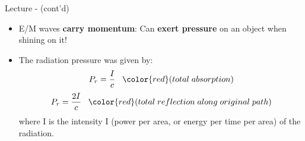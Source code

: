 %
%
%

\begin{frame}{Lecture \summarizedlecture - \lecturesummarytitle (cont'd)}

\begin{itemize}

\item
E/M waves {\bf carry momentum}:
Can {\bf exert pressure} on an object when shining on it!\\

\item
The radiation pressure was given by:
\begin{equation*}
  P_r = \frac{I}{c}
  \;\;\; {\color{red} (total \; absorption)}
\end{equation*}
\begin{equation*}
  P_r = \frac{2I}{c}
  \;\;\; {\color{red} (total \; reflection \; along \; original \; path)}
\end{equation*}
where I is the intensity I (power per area, or energy per time
per area) of the radiation.

\end{itemize}

\end{frame}

